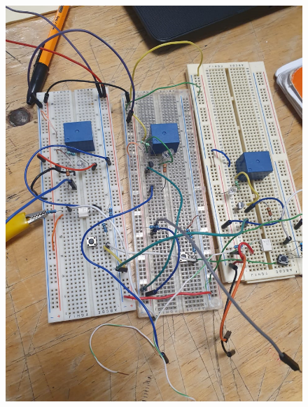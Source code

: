\documentclass[11pt,a4paper]{article}
\begin{document}
\begin{figure}[hbtp]
\centering
\includegraphics[scale=0.30]{001.png} 
\end{figure}
\end{document}
